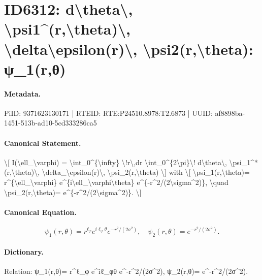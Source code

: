 \section*{ID6312: d\textbackslash{}theta\textbackslash{}, \textbackslash{}psi1\textasciicircum{}(r,\textbackslash{}theta)\textbackslash{}, \textbackslash{}delta\textbackslash{}epsilon(r)\textbackslash{}, \textbackslash{}psi2(r,\textbackslash{}theta): ψ\_1(r,θ)}
\paragraph{Metadata.}
PiID: 9371623130171 | RTEID: RTE:P24510.8978:T2.6873 | UUID: af8898ba-1451-513b-ad10-5cd333286ca5

\paragraph{Canonical Statement.}
\textbackslash{}[ I(\textbackslash{}ell\_\textbackslash{}varphi) = \textbackslash{}int\_0\textasciicircum{}\{\textbackslash{}infty\} \textbackslash{}!r\textbackslash{},dr \textbackslash{}int\_0\textasciicircum{}\{2\textbackslash{}pi\}\textbackslash{}! d\textbackslash{}theta\textbackslash{}, \textbackslash{}psi\_1\textasciicircum{}*(r,\textbackslash{}theta)\textbackslash{}, \textbackslash{}delta\_\textbackslash{}epsilon(r)\textbackslash{}, \textbackslash{}psi\_2(r,\textbackslash{}theta) \textbackslash{}] with \textbackslash{}[ \textbackslash{}psi\_1(r,\textbackslash{}theta)= r\textasciicircum{}\{\textbackslash{}ell\_\textbackslash{}varphi\} e\textasciicircum{}\{i\textbackslash{}ell\_\textbackslash{}varphi\textbackslash{}theta\} e\textasciicircum{}\{-r\textasciicircum{}2/(2\textbackslash{}sigma\textasciicircum{}2)\}, \textbackslash{}quad \textbackslash{}psi\_2(r,\textbackslash{}theta)= e\textasciicircum{}\{-r\textasciicircum{}2/(2\textbackslash{}sigma\textasciicircum{}2)\}. \textbackslash{}]

\paragraph{Canonical Equation.}
\[
\psi_1(r,\theta)= r^{\ell_\varphi} e^{i\ell_\varphi\theta} e^{-r^2/(2\sigma^2)}, \quad \psi_2(r,\theta)= e^{-r^2/(2\sigma^2)}.
\]

\paragraph{Dictionary.}
Relation: ψ\_1(r,θ)= r\textasciicircum{}ℓ\_φ e\textasciicircum{}iℓ\_φθ e\textasciicircum{}-r\textasciicircum{}2/(2σ\textasciicircum{}2), ψ\_2(r,θ)= e\textasciicircum{}-r\textasciicircum{}2/(2σ\textasciicircum{}2).

